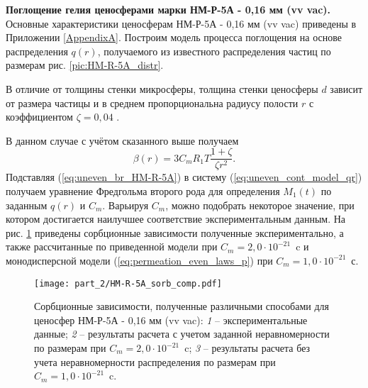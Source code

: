 \textbf{Поглощение гелия ценосферами марки НМ-Р-5А - 0,16 мм (vv vac).}
Основные характеристики ценосферам НМ-Р-5А - 0,16 мм (vv vac) приведены в Приложении \ref{AppendixA}. Построим модель процесса поглощения на основе распределения $q(r)$, получаемого из известного распределения частиц по размерам рис. \ref{pic:HM-R-5A_distr}.

В отличие от толщины стенки микросферы, толщина стенки ценосферы $d$ зависит от размера частицы и в среднем пропорциональна радиусу полости $r$ с коэффициентом $\zeta=0,04$  \cite{Ver_Kurteeva}.

В данном случае с учётом сказанного выше получаем
\begin{equation}
\label{eq:uneven_br_HM-R-5A}
\beta(r) = 3 C_m R_1 T \frac{1+\zeta}{\zeta r^2} .
\end{equation}
Подставляя (\ref{eq:uneven_br_HM-R-5A}) в систему (\ref{eq:uneven_cont_model_qr}) получаем уравнение Фредгольма второго рода для определения $M_1(t)$ по заданным $q(r)$ и $C_m$. Варьируя $C_m$, можно подобрать некоторое значение, при котором достигается наилучшее соответствие экспериментальным данным. На рис. \ref{pic:HM-R-5A_sorb_comp} приведены сорбционные зависимости полученные экспериментально, а также рассчитанные по приведенной модели при $C_m=2,0\cdot 10^{-21}$~c и монодисперсной модели (\ref{eq:permeation_even_laws_p}) при $C_m = 1,0\cdot 10^{-21}$~с.

\begin{figure}[ht]
	\centering
	\texttt{[image: part\_2/HM-R-5A\_sorb\_comp.pdf]}\\
	\caption{Сорбционные зависимости, полученные различными способами для ценосфер НМ-Р-5А - 0,16 мм (vv vac):
		\textit{1} -- экспериментальные данные;
		\textit{2} -- результаты расчета с учетом заданной неравномерности по размерам при $C_m=2,0\cdot 10^{-21}$~c;
		\textit{3} -- результаты расчета без учета неравномерности распределения по размерам при $C_m=1,0\cdot 10^{-21}$~c.
	}
	\label{pic:HM-R-5A_sorb_comp}
\end{figure}



